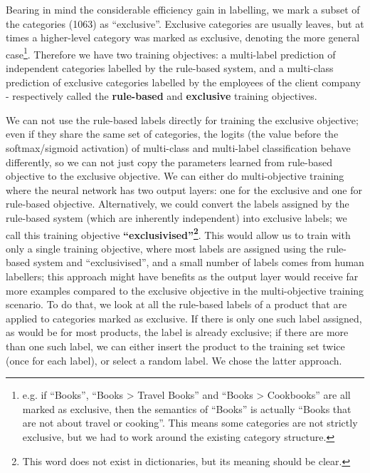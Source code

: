 Bearing in mind the considerable efficiency gain in labelling, we mark a subset of the categories (1063) as ``exclusive''.
Exclusive categories are usually leaves, but at times a higher-level category was marked as exclusive, denoting the more general case\footnote{e.g. if ``Books'', ``Books > Travel Books'' and ``Books > Cookbooks'' are all marked as exclusive, then the semantics of ``Books'' is actually ``Books that are not about travel or cooking''. This means some categories are not strictly exclusive, but we had to work around the existing category structure.}.
Therefore we have two training objectives: a multi-label prediction of independent categories labelled by the rule-based system, and a multi-class prediction of exclusive categories labelled by the employees of the client company - respectively called the \textbf{rule-based} and \textbf{exclusive} training objectives.

We can not use the rule-based labels directly for training the exclusive objective; even if they share the same set of categories, the logits (the value before the softmax/sigmoid activation) of multi-class and multi-label classification behave differently, so we can not just copy the parameters learned from rule-based objective to the exclusive objective.
We can either do multi-objective training where the neural network has two output layers: one for the exclusive and one for rule-based objective.
Alternatively, we could convert the labels assigned by the rule-based system (which are inherently independent) into exclusive labels; we call this training objective \textbf{``exclusivised''\footnote{This word does not exist in dictionaries, but its meaning should be clear.}}.
This would allow us to train with only a single training objective, where most labels are assigned using the rule-based system and ``exclusivised'', and a small number of labels comes from human labellers; this approach might have benefits as the output layer would receive far more examples compared to the exclusive objective in the multi-objective training scenario.
To do that, we look at all the rule-based labels of a product that are applied to categories marked as exclusive.
If there is only one such label assigned, as would be for most products, the label is already exclusive; if there are more than one such label, we can either insert the product to the training set twice (once for each label), or select a random label.
We chose the latter approach.

\label{label_imbalance}

